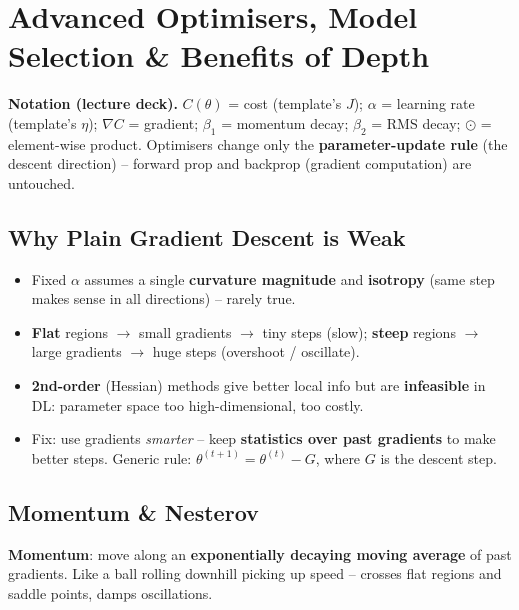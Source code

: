 \documentclass[10pt,a4paper]{article}
\begin{document}
	\section{Advanced Optimisers, Model Selection \& Benefits of Depth}

	\begin{importantbox}
		\textbf{Notation (lecture deck).} $C(\theta)$ = cost (template's $J$); $\alpha$ = learning rate (template's $\eta$); $\nabla C$ = gradient; $\beta_1$ = momentum decay; $\beta_2$ = RMS decay; $\odot$ = element-wise product. Optimisers change only the \textbf{parameter-update rule} (the descent direction) -- forward prop and backprop (gradient computation) are untouched.
	\end{importantbox}

	\subsection{Why Plain Gradient Descent is Weak}

	\begin{itemize}[leftmargin=*]
		\item Fixed $\alpha$ assumes a single \textbf{curvature magnitude} and \textbf{isotropy} (same step makes sense in all directions) -- rarely true.
		\item \textbf{Flat} regions $\rightarrow$ small gradients $\rightarrow$ tiny steps (slow); \textbf{steep} regions $\rightarrow$ large gradients $\rightarrow$ huge steps (overshoot / oscillate).
		\item \textbf{2nd-order} (Hessian) methods give better local info but are \textbf{infeasible} in DL: parameter space too high-dimensional, too costly.
		\item Fix: use gradients \emph{smarter} -- keep \textbf{statistics over past gradients} to make better steps. Generic rule: $\theta^{(t+1)} = \theta^{(t)} - G$, where $G$ is the descent step.
	\end{itemize}

	\subsection{Momentum \& Nesterov}

	\begin{definitionbox}
		\textbf{Momentum}: move along an \textbf{exponentially decaying moving average} of past gradients. Like a ball rolling downhill picking up speed -- crosses flat regions and saddle points, damps oscillations.
	\end{definitionbox}
\end{document}
